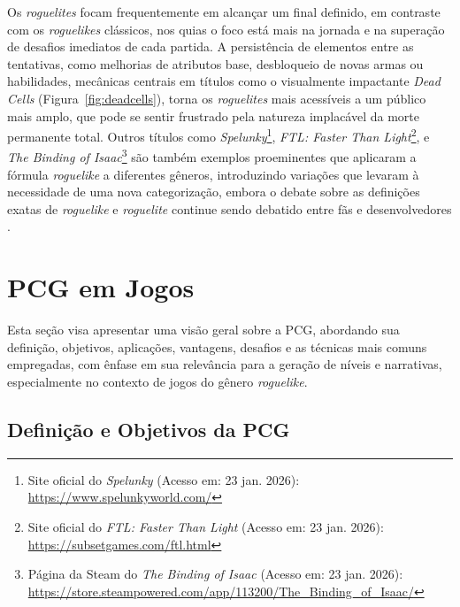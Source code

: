 Os \textit{roguelites} focam frequentemente em alcançar um final definido, em
contraste com os \textit{roguelikes} clássicos, nos quias o foco está mais na jornada
e na superação de desafios imediatos de cada partida. A persistência de
elementos entre as tentativas, como melhorias de atributos base, desbloqueio de
novas armas ou habilidades, mecânicas centrais em títulos como o visualmente
impactante \textit{Dead Cells} (Figura~\ref{fig:deadcells}), torna os
\textit{roguelites} mais acessíveis a um público mais amplo, que pode se sentir
frustrado pela natureza implacável da morte permanente total. Outros títulos
como \textit{Spelunky}\footnote{Site oficial do \textit{Spelunky} (Acesso em: 23 jan. 2026): \url{https://www.spelunkyworld.com/}}, \textit{FTL:
	Faster Than Light}\footnote{Site oficial do \textit{FTL:
		Faster Than Light} (Acesso em: 23 jan. 2026): \url{https://subsetgames.com/ftl.html}}, e \textit{The
	Binding of
	Isaac}\footnote{Página da Steam do \textit{The
		Binding of
		Isaac} (Acesso em: 23 jan. 2026): \url{https://store.steampowered.com/app/113200/The\_Binding\_of\_Isaac/}}
são também exemplos proeminentes que aplicaram a fórmula \textit{roguelike} a
diferentes gêneros, introduzindo variações que levaram à necessidade de uma nova
categorização, embora o debate sobre as definições exatas de \textit{roguelike}
e \textit{roguelite} continue sendo debatido entre fãs e desenvolvedores \cite{Cartlidge2024Genre}.

\section{\texorpdfstring{\gls{PCG}}{PCG} em Jogos}
\label{sec:pcg_em_jogos}

Esta seção visa apresentar uma visão geral sobre a \gls{PCG}, abordando sua
definição, objetivos, aplicações, vantagens, desafios e as técnicas mais comuns
empregadas, com ênfase em sua relevância para a geração de níveis e narrativas,
especialmente no contexto de jogos do gênero \textit{roguelike}.

\subsection{Definição e Objetivos da \texorpdfstring{\gls{PCG}}{PCG}}
\label{subsec:definicao_objetivos_pcg}

